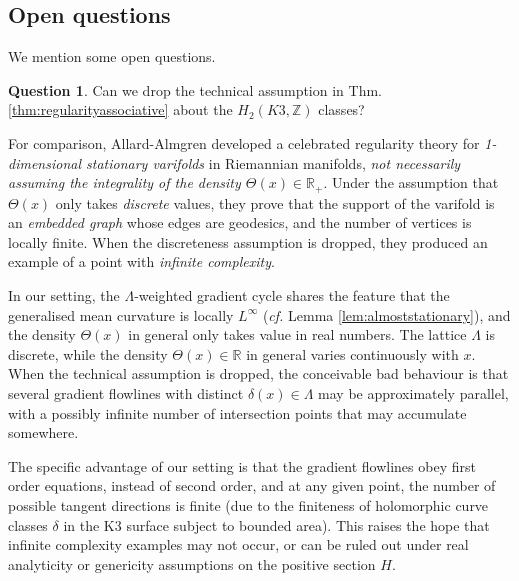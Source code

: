 \documentclass{article}
\theoremstyle{definition}
\newtheorem{Question}{Question}
\newcommand{\cf}{\emph{cf.} }
\newcommand{\R}{\mathbb{R}}
\newcommand{\Z}{\mathbb{Z}}
\begin{document}
		
					
		
		
		\subsection{Open questions}
		
		
		
		
		We mention some open questions. 
		
		
		\begin{Question}
		Can we drop the technical assumption  in Thm. \ref{thm:regularityassociative} about the $H_2(K3,\Z)$ classes?
		\end{Question}
		
		
		
		For comparison, Allard-Almgren \cite{AllardAlmgren} developed a celebrated regularity theory for \emph{1-dimensional stationary varifolds} in Riemannian manifolds, \emph{not necessarily assuming the integrality of the density $\Theta(x)\in \R_+$}. Under the assumption that $\Theta(x)$ only takes \emph{discrete} values, they prove that the support of the varifold is  an \emph{embedded graph} whose edges are geodesics, and the number of vertices is locally finite. When the discreteness assumption is dropped, they produced an example of a point with \emph{infinite complexity}. 
		
		
		
		In our setting, the $\Lambda$-weighted gradient cycle shares the feature that the generalised mean curvature is locally $L^\infty$ (\cf Lemma \ref{lem:almoststationary}), and the density $\Theta(x)$ in general only takes value in real numbers. The lattice $\Lambda$ is discrete, while the density $\Theta(x)\in \R$ in general varies continuously with $x$. When the technical assumption is dropped, the conceivable bad behaviour is that several gradient flowlines with distinct $\delta(x)\in \Lambda$ may be approximately parallel, with a possibly infinite number of intersection points that may accumulate somewhere.
		

		
		
		
		
		
		The specific advantage of our setting is that the gradient flowlines obey first order equations, instead of second order, and at any given point, the number of possible tangent directions is finite (due to the finiteness of holomorphic curve classes $\delta$ in the K3 surface subject to bounded area). This raises the hope that infinite complexity examples may not occur, or can be ruled out under real analyticity or genericity assumptions on the positive section $H$.
		
\end{document}

